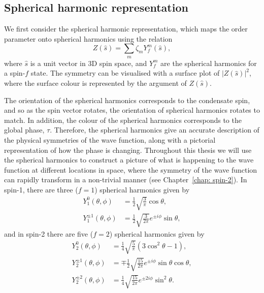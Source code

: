 \subsection{Spherical harmonic representation}
We first consider the spherical harmonic representation, which maps the
order parameter onto spherical harmonics using the relation
\begin{equation}\label{eq: spherical-harmonics}
    Z(\hat{s}) = \sum_m\zeta_m Y_f^m(\hat{s}),
\end{equation}
where \(\hat{s}\) is a unit vector in 3D spin space, and \(Y_f^m \) are the
spherical harmonics for a spin-\(f\) state.
The symmetry can be visualised with a surface plot of \(|Z(\hat{s})|^2\),
where the surface colour is represented by the argument of \(Z(\hat{s})\).

The orientation of the spherical harmonics corresponds to the condensate spin,
and so as the spin vector rotates, the orientation of spherical harmonics
rotates to match.
In addition, the colour of the spherical harmonics corresponds to the global
phase, \( \tau \).
Therefore, the spherical harmonics give an accurate description of the
physical symmetries of the wave function, along with a pictorial representation
of how the phase is changing.
Throughout this thesis we will use the spherical harmonics to construct a
picture of what is happening to the wave function at different locations in
space, where the symmetry of the wave function can rapidly transform in a
non-trivial manner (see Chapter~\ref{chap: spin-2}).
In spin-1, there are three (\(f = 1\)) spherical harmonics given by
\begin{align}
    Y_1^0(\theta, \phi)       & = \frac{1}{2}\sqrt{\frac{3}{\pi}}\cos\theta, \\
    Y_1^{\pm 1}(\theta, \phi) & =
    \frac{1}{2}\sqrt{\frac{3}{2\pi}}e^{\pm i \phi}\sin\theta,
\end{align}
and in spin-2 there are five (\(f = 2\)) spherical harmonics given by
\begin{align}
    Y_2^0(\theta, \phi)       & = \frac{1}{4}\sqrt{\frac{5}{\pi}}
    (3\cos^2\theta - 1),                                                    \\
    Y_2^{\pm 1}(\theta, \phi) & =
    \mp \frac{1}{2}\sqrt{\frac{15}{2\pi}}e^{\pm i\phi}\sin\theta\cos\theta, \\
    Y_2^{\pm 2}(\theta, \phi) & =
    \frac{1}{4}\sqrt{\frac{15}{2\pi}}e^{\pm 2i\phi}\sin^2\theta.
\end{align}

